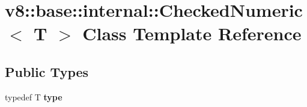 \hypertarget{classv8_1_1base_1_1internal_1_1_checked_numeric}{}\section{v8\+:\+:base\+:\+:internal\+:\+:Checked\+Numeric$<$ T $>$ Class Template Reference}
\label{classv8_1_1base_1_1internal_1_1_checked_numeric}
\subsection*{Public Types}
\begin{DoxyCompactItemize}
\item 
typedef T {\bfseries type}\hypertarget{classv8_1_1base_1_1internal_1_1_checked_numeric_a86b38431f32eef8bb1089c7e5677fcf9}{}\label{classv8_1_1base_1_1internal_1_1_checked_numeric_a86b38431f32eef8bb1089c7e5677fcf9}

\end{DoxyCompactItemize}
